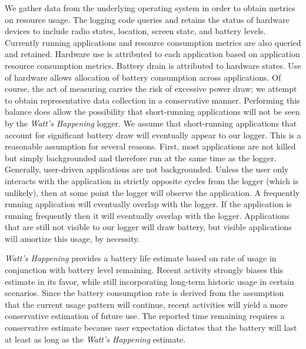 We gather data from the underlying operating system in order to obtain metrics on resource usage.
The logging code queries and retains the status of hardware devices to include radio states, location, screen state, and battery levels.
Currently running applications and resource consumption metrics are also queried and retained. 
Hardware use is attributed to each application based on application resource consumption metrics. 
Battery drain is attributed to hardware states.
Use of hardware allows allocation of battery consumption across applications.
Of course, the act of measuring carries the risk of excessive power draw; we attempt to obtain representative data collection in a conservative manner.
Performing this balance does allow the possibility that short-running applications will not be seen by the \emph{Watt's Happening} logger.
We assume that short-running applications that account for significant battery draw will eventually appear to our logger.
This is a reasonable assumption for several reasons.
First, most applications are not killed but simply backgrounded and therefore run at the same time as the logger.
Generally, user-driven applications are not backgrounded.
Unless the user only interacts with the application in strictly opposite cycles from the logger (which is unlikely), then at some point the logger will observe the application.
A frequently running application will eventually overlap with the logger.
If the application is running frequently then it will eventually overlap with the logger.
Applications that are still not visible to our logger will draw battery, but visible applications will amortize this usage, by necessity.

\emph{Watt's Happening} provides a battery life estimate based on rate of usage in conjunction with battery level remaining.
Recent activity strongly biases this estimate in its favor, while still incorporating long-term historic usage in certain scenarios.
Since the battery consumption rate is derived from the assumption that the current usage pattern will continue, recent activities will yield a more conservative estimation of future use.
The reported time remaining requires a conservative estimate because user expectation dictates that the battery will last at least as long as the \emph{Watt's Happening} estimate.


